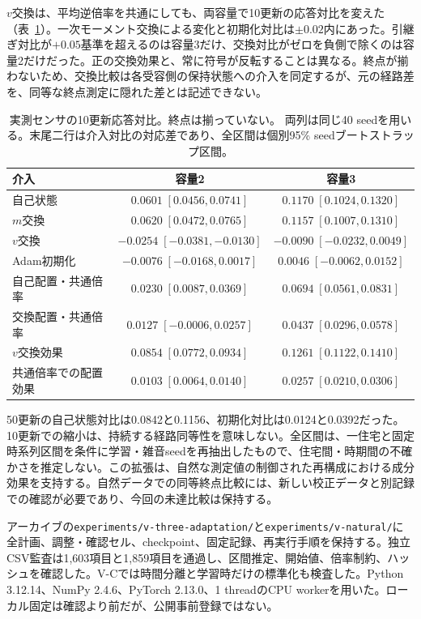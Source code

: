 $v$交換は、平均逆倍率を共通にしても、両容量で10更新の応答対比を変えた（表~\ref{tab:vc}）。一次モーメント交換による変化と初期化対比は$\pm0.02$内にあった。引継ぎ対比が$+0.05$基準を超えるのは容量3だけ、交換対比がゼロを負側で除くのは容量2だけだった。正の交換効果と、常に符号が反転することは異なる。終点が揃わないため、交換比較は各受容側の保持状態への介入を同定するが、元の経路差を、同等な終点測定に隠れた差とは記述できない。
\begin{table}[ht]
\centering\small
\caption{実測センサの10更新応答対比。終点は揃っていない。 両列は同じ40 seedを用いる。末尾二行は介入対比の対応差であり、全区間は個別95\% seedブートストラップ区間。}
\label{tab:vc}
\begin{tabular}{lcc}
\toprule
介入 & 容量2 & 容量3\\
\midrule
自己状態 & $0.0601\;[0.0456,0.0741]$ & $0.1170\;[0.1024,0.1320]$\\
$m$交換 & $0.0620\;[0.0472,0.0765]$ & $0.1157\;[0.1007,0.1310]$\\
$v$交換 & $-0.0254\;[-0.0381,-0.0130]$ & $-0.0090\;[-0.0232,0.0049]$\\
Adam初期化 & $-0.0076\;[-0.0168,0.0017]$ & $0.0046\;[-0.0062,0.0152]$\\
自己配置・共通倍率 & $0.0230\;[0.0087,0.0369]$ & $0.0694\;[0.0561,0.0831]$\\
交換配置・共通倍率 & $0.0127\;[-0.0006,0.0257]$ & $0.0437\;[0.0296,0.0578]$\\
\midrule
$v$交換効果 & $0.0854\;[0.0772,0.0934]$ & $0.1261\;[0.1122,0.1410]$\\
共通倍率での配置効果 & $0.0103\;[0.0064,0.0140]$ & $0.0257\;[0.0210,0.0306]$\\
\bottomrule
\end{tabular}
\end{table}

50更新の自己状態対比は0.0842と0.1156、初期化対比は0.0124と0.0392だった。10更新での縮小は、持続する経路同等性を意味しない。全区間は、一住宅と固定時系列区間を条件に学習・雑音seedを再抽出したもので、住宅間・時期間の不確かさを推定しない。この拡張は、自然な測定値の制御された再構成における成分効果を支持する。自然データでの同等終点比較には、新しい校正データと別記録での確認が必要であり、今回の未達比較は保持する。

アーカイブの\texttt{experiments/v-three-adaptation/}と\texttt{experiments/v-natural/}に全計画、調整・確認セル、checkpoint、固定記録、再実行手順を保持する。独立CSV監査は1,603項目と1,859項目を通過し、区間推定、開始値、倍率制約、ハッシュを確認した。V-Cでは時間分離と学習時だけの標準化も検査した。Python 3.12.14、NumPy 2.4.6、PyTorch 2.13.0、1 threadのCPU workerを用いた。ローカル固定は確認より前だが、公開事前登録ではない。
